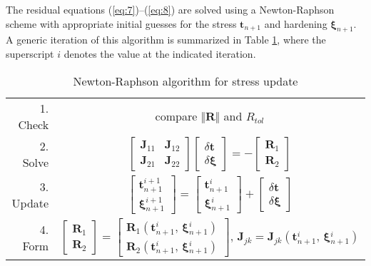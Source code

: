\documentclass[review]{elsarticle}
\begin{document}
	The residual equations (\ref{eq:7})--(\ref{eq:8}) are solved using a Newton-Raphson scheme with appropriate initial guesses for the stress $\mathbf{t}_{n+1}$ and hardening $\bm{\xi}_{n+1}$.
	A generic iteration of this algorithm is summarized in Table \ref{table:1}, where the superscript $i$ denotes the value at the indicated iteration.
	\begin{table}[htbp]
	\centering
	\caption{\label{table:1}Newton-Raphson algorithm for stress update}
	\begin{tabular}{|r c|}
	\hline
      1. Check & compare $\Vert \mathbf{R} \Vert$ and $R_{tol}$ \\
      2. Solve & $\begin{bmatrix} \mathbf{J}_{11} & \mathbf{J}_{12} \\ \mathbf{J}_{21} & \mathbf{J}_{22} \end{bmatrix}\begin{bmatrix} \delta \mathbf{t} \\ \delta \bm{\xi} \end{bmatrix}=-\begin{bmatrix} \mathbf{R}_1 \\ \mathbf{R}_2 \end{bmatrix}$ \\
      3. Update & $\begin{bmatrix} \mathbf{t}{_{n+1}^{i+1}} \\ \bm{\xi}{_{n+1}^{i+1}} \end{bmatrix}=\begin{bmatrix} \mathbf{t}{_{n+1}^i} \\ \bm{\xi}{_{n+1}^i} \end{bmatrix}+\begin{bmatrix} \delta \mathbf{t} \\ \delta \bm{\xi} \end{bmatrix}$ \\
      4. Form & $\begin{bmatrix} \mathbf{R}_1 \\ \mathbf{R}_2 \end{bmatrix}=\begin{bmatrix} \mathbf{R}_1 \left( \mathbf{t}{_{n+1}^i},\,\bm{\xi}{_{n+1}^i} \right) \\ \mathbf{R}_2 \left( \mathbf{t}{_{n+1}^i},\,\bm{\xi}{_{n+1}^i} \right) \end{bmatrix},\,\mathbf{J}_{jk}=\mathbf{J}_{jk}\left( \mathbf{t}{_{n+1}^i},\,\bm{\xi}{_{n+1}^i} \right)$ \\
      \hline
	\end{tabular}
	\end{table}
	
\end{document}
